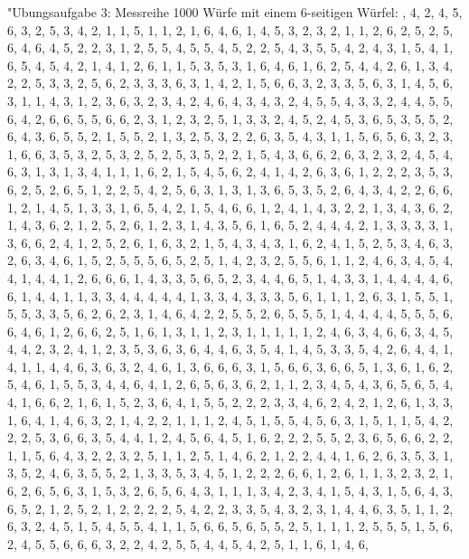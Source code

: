 

	  "Ubungsaufgabe 3: \newline
	Messreihe 1000 Würfe mit einem 6-seitigen Würfel: , 4, 2, 4, 5, 6, 3, 2, 5, 3, 4, 2, 1, 1, 5, 1, 1, 2, 1, 6, 4, 6, 1, 4, 5, 3, 2, 3, 2, 1, 1, 2, 6, 2, 5, 2, 5, 6, 4, 6, 4, 5, 2, 2, 3, 1, 2, 5, 5, 4, 5, 5, 4, 5, 2, 2, 5, 4, 3, 5, 5, 4, 2, 4, 3, 1, 5, 4, 1, 6, 5, 4, 5, 4, 2, 1, 4, 1, 2, 6, 1, 1, 5, 3, 5, 3, 1, 6, 4, 6, 1, 6, 2, 5, 4, 4, 2, 6, 1, 3, 4, 2, 2, 5, 3, 3, 2, 5, 6, 2, 3, 3, 3, 6, 3, 1, 4, 2, 1, 5, 6, 6, 3, 2, 3, 3, 5, 6, 3, 1, 4, 5, 6, 3, 1, 1, 4, 3, 1, 2, 3, 6, 3, 2, 3, 4, 2, 4, 6, 4, 3, 4, 3, 2, 4, 5, 5, 4, 3, 3, 2, 4, 4, 5, 5, 6, 4, 2, 6, 6, 5, 5, 6, 6, 2, 3, 1, 2, 3, 2, 5, 1, 3, 3, 2, 4, 5, 2, 4, 5, 3, 6, 5, 3, 5, 5, 2, 6, 4, 3, 6, 5, 5, 2, 1, 5, 5, 2, 1, 3, 2, 5, 3, 2, 2, 6, 3, 5, 4, 3, 1, 1, 5, 6, 5, 6, 3, 2, 3, 1, 6, 6, 3, 5, 3, 2, 5, 3, 2, 5, 2, 5, 3, 5, 2, 2, 1, 5, 4, 3, 6, 6, 2, 6, 3, 2, 3, 2, 4, 5, 4, 6, 3, 1, 3, 1, 3, 4, 1, 1, 1, 6, 2, 1, 5, 4, 5, 6, 2, 4, 1, 4, 2, 6, 3, 6, 1, 2, 2, 2, 3, 5, 3, 6, 2, 5, 2, 6, 5, 1, 2, 2, 5, 4, 2, 5, 6, 3, 1, 3, 1, 3, 6, 5, 3, 5, 2, 6, 4, 3, 4, 2, 2, 6, 6, 1, 2, 1, 4, 5, 1, 3, 3, 1, 6, 5, 4, 2, 1, 5, 4, 6, 6, 1, 2, 4, 1, 4, 3, 2, 2, 1, 3, 4, 3, 6, 2, 1, 4, 3, 6, 2, 1, 2, 5, 2, 6, 1, 2, 3, 1, 4, 3, 5, 6, 1, 6, 5, 2, 4, 4, 4, 2, 1, 3, 3, 3, 3, 1, 3, 6, 6, 2, 4, 1, 2, 5, 2, 6, 1, 6, 3, 2, 1, 5, 4, 3, 4, 3, 1, 6, 2, 4, 1, 5, 2, 5, 3, 4, 6, 3, 2, 6, 3, 4, 6, 1, 5, 2, 5, 5, 5, 6, 5, 2, 5, 1, 4, 2, 3, 2, 5, 5, 6, 1, 1, 2, 4, 6, 3, 4, 5, 4, 4, 1, 4, 4, 1, 2, 6, 6, 6, 1, 4, 3, 3, 5, 6, 5, 2, 3, 4, 4, 6, 5, 1, 4, 3, 3, 1, 4, 4, 4, 4, 6, 6, 1, 4, 4, 1, 1, 3, 3, 4, 4, 4, 4, 4, 1, 3, 3, 4, 3, 3, 3, 5, 6, 1, 1, 1, 2, 6, 3, 1, 5, 5, 1, 5, 5, 3, 3, 5, 6, 2, 6, 2, 3, 1, 4, 6, 4, 2, 2, 5, 5, 2, 6, 5, 5, 5, 1, 4, 4, 4, 4, 5, 5, 5, 6, 6, 4, 6, 1, 2, 6, 6, 2, 5, 1, 6, 1, 3, 1, 1, 2, 3, 1, 1, 1, 1, 1, 2, 4, 6, 3, 4, 6, 6, 3, 4, 5, 4, 4, 2, 3, 2, 4, 1, 2, 3, 5, 3, 6, 3, 6, 4, 4, 6, 3, 5, 4, 1, 4, 5, 3, 3, 5, 4, 2, 6, 4, 4, 1, 4, 1, 1, 4, 4, 6, 3, 6, 3, 2, 4, 6, 1, 3, 6, 6, 6, 3, 1, 5, 6, 6, 3, 6, 6, 5, 1, 3, 6, 1, 6, 2, 5, 4, 6, 1, 5, 5, 3, 4, 4, 6, 4, 1, 2, 6, 5, 6, 3, 6, 2, 1, 1, 2, 3, 4, 5, 4, 3, 6, 5, 6, 5, 4, 4, 1, 6, 6, 2, 1, 6, 1, 5, 2, 3, 6, 4, 1, 5, 5, 2, 2, 2, 3, 3, 4, 6, 2, 4, 2, 1, 2, 6, 1, 3, 3, 1, 6, 4, 1, 4, 6, 3, 2, 1, 4, 2, 2, 1, 1, 1, 2, 4, 5, 1, 5, 5, 4, 5, 6, 3, 1, 5, 1, 1, 5, 4, 2, 2, 2, 5, 3, 6, 6, 3, 5, 4, 4, 1, 2, 4, 5, 6, 4, 5, 1, 6, 2, 2, 2, 5, 5, 2, 3, 6, 5, 6, 6, 2, 2, 1, 1, 5, 6, 4, 3, 2, 2, 3, 2, 5, 1, 1, 2, 5, 1, 4, 6, 2, 1, 2, 2, 4, 4, 1, 6, 2, 6, 3, 5, 3, 1, 3, 5, 2, 4, 6, 3, 5, 5, 2, 1, 3, 3, 5, 3, 4, 5, 1, 2, 2, 2, 6, 6, 1, 2, 6, 1, 1, 3, 2, 3, 2, 1, 6, 2, 6, 5, 6, 3, 1, 5, 3, 2, 6, 5, 6, 4, 3, 1, 1, 1, 3, 4, 2, 3, 4, 1, 5, 4, 3, 1, 5, 6, 4, 3, 6, 5, 2, 1, 2, 5, 2, 1, 2, 2, 2, 2, 5, 4, 2, 2, 3, 3, 5, 4, 3, 2, 3, 1, 4, 4, 6, 3, 5, 1, 1, 2, 6, 3, 2, 4, 5, 1, 5, 4, 5, 5, 4, 1, 1, 5, 6, 6, 5, 6, 5, 5, 2, 5, 1, 1, 1, 2, 5, 5, 5, 1, 5, 6, 2, 4, 5, 5, 6, 6, 6, 3, 2, 2, 4, 2, 5, 5, 4, 4, 5, 4, 2, 5, 1, 1, 6, 1, 4, 6, 